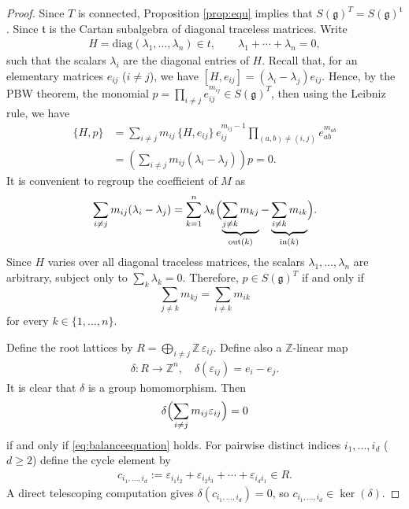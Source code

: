 \documentclass[11pt,reqno]{amsart}
\newtheorem*{theorem A}{Main Theorem A}
\newtheorem*{theorem B}{Main Theorem B}
\newtheorem*{theorem C}{Main Theorem C}
\newtheorem*{theorem D}{Main Theorem D}
\theoremstyle{definition}
\theoremstyle{plain}
\theoremstyle{conclusion}
\begin{document}
\begin{proof}
  Since $T$ is connected, Proposition \ref{prop:equ} implies that $S(\mathfrak{g})^T = S(\mathfrak{g})^\mathfrak{t}$. Since $\mathfrak{t}$ is the Cartan subalgebra of diagonal traceless matrices. Write  \begin{align*}
      H=\mathrm{diag}(\lambda_1,\dots,\lambda_n)\in t, \qquad \lambda_1 +\cdots + \lambda_n = 0,
  \end{align*} such that the scalars $\lambda_i$ are the diagonal entries of $H$. Recall that, for an elementary matrices $e_{ij}$ ($i \neq j$), we have $[H,e_{ij}] = (\lambda_i - \lambda_j) e_{ij}$. Hence, by the PBW theorem, the monomial $p = \prod_{ i \neq j} e_{ij}^{m_{ij}} \in S(\mathfrak{g})^T$, then using the Leibniz rule, we have \begin{align*}
      \{H,p\}&=\sum_{i\neq j} m_{ij}\,\{H,e_{ij}\}\,e_{ij}^{m_{ij}-1}\prod_{(a,b)\neq(i,j)} e_{ab}^{m_{ab}}\\
&=\left(\sum_{i\neq j} m_{ij}(\lambda_i-\lambda_j)\right)p = 0.
  \end{align*} It is convenient to regroup the coefficient of $M$ as
\begin{align*}
\sum_{i\neq j} m_{ij}(\lambda_i-\lambda_j)
=\sum_{k=1}^n \lambda_k\Bigl(\underbrace{\sum_{j\neq k} m_{kj}}_{\text{out}(k)}-\underbrace{\sum_{i\neq k} m_{ik}}_{\text{in}(k)}\Bigr).
\end{align*}
Since $H$ varies over all diagonal traceless matrices, the scalars $\lambda_1,\dots,\lambda_n$ are arbitrary, subject only to $\sum_k\lambda_k =0$. Therefore, $p\in S(\mathfrak{g})^T$ if and only if  \begin{equation}
    \sum_{j\neq k}m_{kj}=\sum_{i\neq k}m_{ik} \label{eq:balanceequation}
\end{equation}   for every $k\in\{1,\dots,n\}$.

Define the root lattices by $R = \bigoplus_{i\neq j}\mathbb{Z}\,\varepsilon_{ij}$. Define also a $\mathbb{Z}$-linear map \begin{align*}
    \delta: R \rightarrow \mathbb{Z}^n, \quad \delta(\varepsilon_{ij}) = e_i  - e_j.
\end{align*} It is clear that $\delta$ is a group homomorphism.  Then \begin{align*}
\delta\Bigl(\sum_{i\neq j} m_{ij} \varepsilon_{ij}\Bigr) = 0
\end{align*} if and only if \eqref{eq:balanceequation} holds. For pairwise distinct indices $i_1,\dots,i_d$ ($d \geq 2$) define the cycle element by \begin{align*}
c_{i_1,\dots,i_d} := \varepsilon_{i_1 i_2} + \varepsilon_{i_2 i_3}+ \cdots+\varepsilon_{i_d i_1}\in R.
\end{align*} A direct telescoping computation gives $\delta(c_{i_1,\dots,i_d}) = 0$, so $c_{i_1,\dots,i_d}\in\ker(\delta)$.


\end{proof}
\end{document}
